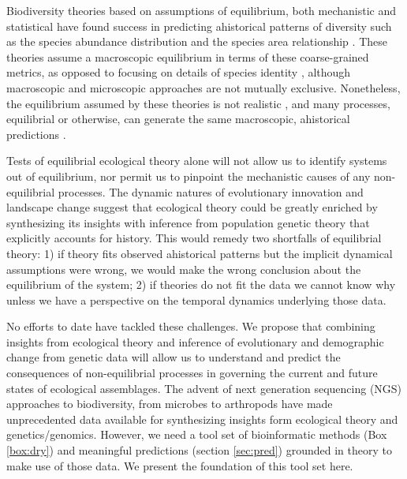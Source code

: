 \documentclass[12pt]{article}
\newcounter{Box}
\begin{document}
Biodiversity theories based on assumptions of equilibrium, both
mechanistic \citep{hubbell2001, chesson2000, tilman2004} and
statistical \citep[see the Glossary;][]{harte2011, pueyo2007}
have found success in predicting ahistorical patterns of diversity
such as the species abundance distribution \citep{white2012,
  hubbell2001, harte2011} and the species area relationship
\citep{hubbell2001, harte2011}. These theories assume a
macroscopic equilibrium in terms of these coarse-grained metrics, as
opposed to focusing on details of species identity \citep[such as
in][]{blonder2015}, although macroscopic and microscopic approaches
are not mutually exclusive.  Nonetheless, the equilibrium assumed by
these theories is not realistic \citep{ricklefs2006}, and many
processes, equilibrial or otherwise, can generate the same
macroscopic, ahistorical predictions \citep{mcgill2007}.

Tests of equilibrial ecological theory alone will not allow us to
identify systems out of equilibrium, nor permit us to pinpoint the
mechanistic causes of any non-equilibrial processes. The dynamic
natures of evolutionary innovation and landscape change suggest that
ecological theory could be greatly enriched by synthesizing its
insights with inference from population genetic theory that explicitly
accounts for history. This would remedy two shortfalls of equilibrial
theory: 1) if theory fits observed ahistorical patterns but the
implicit dynamical assumptions were wrong, we would make the wrong
conclusion about the equilibrium of the system; 2) if theories do not
fit the data we cannot know why unless we have a perspective on the
temporal dynamics underlying those data.

No efforts to date have tackled these challenges. We propose that
combining insights from ecological theory and inference of
evolutionary and demographic change from genetic data will allow us to
understand and predict the consequences of non-equilibrial processes
in governing the current and future states of ecological
assemblages. The advent of next generation sequencing (NGS) approaches to
biodiversity, from microbes to arthropods \citep{taberlet2012,
  gibson2014, shokralla2015, ji2013, zhou2013, bohmann2014,
  linard2015, leray2015, dodsworth2015, liu2016, venkataraman2015}
have made unprecedented data available for synthesizing insights form
ecological theory and genetics/genomics.  However, we need a tool set
of bioinformatic methods (Box \ref{box:dry}) and meaningful
predictions (section \ref{sec:pred}) grounded in theory to make use of
those data.
%
%
We present the foundation of this tool set here.
\end{document}

